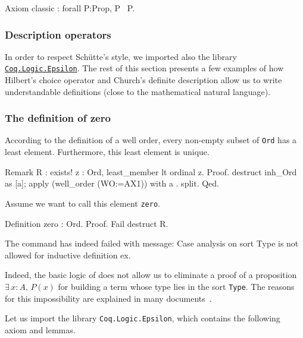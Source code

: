 \begin{Coqsrc}
 Axiom classic : forall P:Prop, P \/ ~P.
\end{Coqsrc}


\subsubsection{Description operators}

In order to respect Schütte's style, we imported also the library 
\href{https://coq.inria.fr/distrib/current/stdlib/Coq.Logic.Epsilon.html}{\texttt{Coq.Logic.Epsilon}}.  The rest of this section presents a few examples of
how Hilbert's choice operator and Church's definite description allow us
 to write understandable definitions (close to the mathematical natural language).


\subsubsection{The definition of zero}

According to the  definition of a well order, every non-empty subset of \texttt{Ord} has a least element. Furthermore, this least element is unique.


\begin{Coqsrc}
Remark R : exists! z : Ord, least_member lt  ordinal z.
Proof.
  destruct inh_Ord as [a]; apply (well_order (WO:=AX1)) with a .
  split.
Qed.
\end{Coqsrc}

Assume we want to call this element  \texttt{zero}.



\begin{Coqsrc}
Definition zero : Ord.
Proof.
  Fail destruct R.
\end{Coqsrc}

\begin{Coqanswer}
The command has indeed failed with message:
Case analysis on sort Type is not allowed for inductive 
definition ex.
\end{Coqanswer}


Indeed, the basic logic of  \coq{} does not allow us to eliminate a proof of a proposition 
$\exists\,x:A,\,P(x)$ for building a term whose type lies in the sort \texttt{Type}. 
The reasons for this impossibility are explained in many documents~\cite{BC04, chlipalacpdt2011, Coq}.

Let us import the library \texttt{Coq.Logic.Epsilon}, which contains the following axiom and lemmas.


